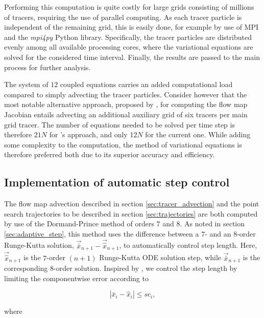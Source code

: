 Performing this computation is quite costly for large grids consisting of millions of tracers, requiring the use of parallel computing. As each tracer particle is independent of the remaining grid, this is easily done, for example by use of MPI and the \textit{mpi4py} Python library. Specifically, the tracer particles are distributed evenly among all available processing cores, where the variational equations are solved for the considered time interval. Finally, the results are passed to the main process for further analysis.

The system of $12$ coupled equations carries an added computational load compared to simply advecting the tracer particles. Consider however that the most notable alternative approach, proposed by \cite{Haller12}, for computing the flow map Jacobian entails advecting an additional auxiliary grid of six tracers per main grid tracer. The number of equations needed to be solved per time step is therefore $21N$ for \cite{Haller12}'s approach, and only $12N$ for the current one. While adding some complexity to the computation, the method of variational equations is therefore preferred both due to its superior accuracy \citep{Oettinger} and efficiency.

\subsection{Implementation of automatic step control}\label{sec:automatic_step_control}

The flow map advection described in section \ref{sec:tracer_advection} and the point search trajectories to be described in section \ref{sec:trajectories} are both computed by use of the Dormand-Prince method of orders $7$ and $8$. As noted in section \ref{sec:adaptive_step}, this method uses the difference between a $7$- and an $8$-order Runge-Kutta solution, $\vec {\bar{x}}_{n+1}-\vec{\widehat{x}}_{n+1}$, to automatically control step length. Here, $\vec{\widehat{x}}_{n+1}$ is the $7$-order $(n+1)$ Runge-Kutta ODE solution step, while $\vec{\bar{x}}_{n+1}$ is the corresponding $8$-order solution. Inspired by \cite{SolvingODEs}, we control the step length by limiting the componentwise error according to

\begin{equation}
\left|\bar{x}_i-\widehat{x}_i\right| \leq sc_i,
\end{equation}

\noindent where

